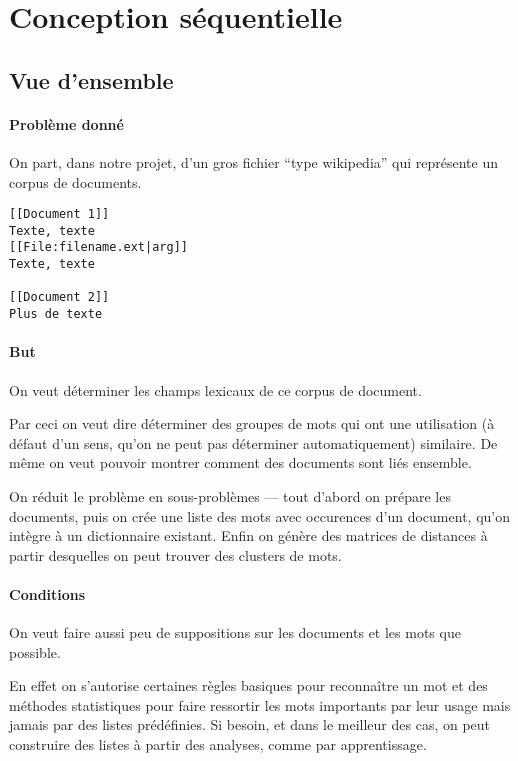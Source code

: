 \section{Conception séquentielle}

\subsection{Vue d'ensemble}

\paragraph{Problème donné}

On part, dans notre projet, d'un gros fichier
``type wikipedia'' qui représente un corpus de documents.
\begin{addmargin}{.5cm}
\begin{verbatim}
[[Document 1]]
Texte, texte
[[File:filename.ext|arg]]
Texte, texte

[[Document 2]]
Plus de texte
\end{verbatim}
\end{addmargin}

\paragraph{But}

On veut déterminer les champs lexicaux de ce corpus de document.

Par ceci on veut dire déterminer des groupes de mots
qui ont une utilisation (à défaut d'un sens, qu'on ne
peut pas déterminer automatiquement) similaire.
De même on veut pouvoir montrer comment des documents
sont liés ensemble.

On réduit le problème en sous-problèmes \----
tout d'abord on prépare les documents,
puis on crée une liste des mots avec occurences
d'un document, qu'on intègre à un dictionnaire existant.
Enfin on génère des matrices de distances à partir
desquelles on peut trouver des clusters de mots.

\paragraph{Conditions}

On veut faire aussi peu de suppositions sur les
documents et les mots que possible.

En effet on s'autorise certaines règles basiques pour
reconnaître un mot et des méthodes statistiques pour
faire ressortir les mots importants par leur usage
mais jamais par des listes prédéfinies.
Si besoin, et dans le meilleur des cas, on peut construire
des listes à partir des analyses, comme par apprentissage.

